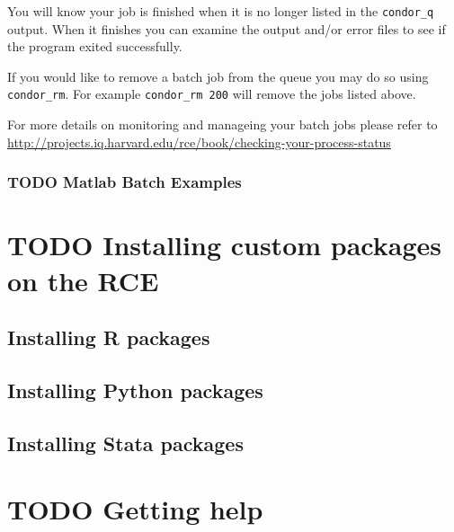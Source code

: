 \documentclass[11pt]{article}
\begin{document}
You will know your job is finished when it is no longer listed in the \texttt{condor\_q} output. When it finishes you can examine the output and/or error files to see if the program exited successfully.

If you would like to remove a batch job from the queue you may do so using \texttt{condor\_rm}. For example \texttt{condor\_rm 200} will remove the jobs listed above.

For more details on monitoring and manageing your batch jobs please refer to \url{http://projects.iq.harvard.edu/rce/book/checking-your-process-status}

\subsubsection{{\bfseries\sffamily TODO} Matlab Batch Examples}
\label{sec:org2438588}


\section{{\bfseries\sffamily TODO} Installing custom packages on the RCE}
\label{sec:orgc632e2a}


\subsection{Installing R packages}
\label{sec:org37a0da3}

\subsection{Installing Python packages}
\label{sec:org051c539}

\subsection{Installing Stata packages}
\label{sec:org36c940f}

\section{{\bfseries\sffamily TODO} Getting help}
\label{sec:orgf1f0a78}
\end{document}

